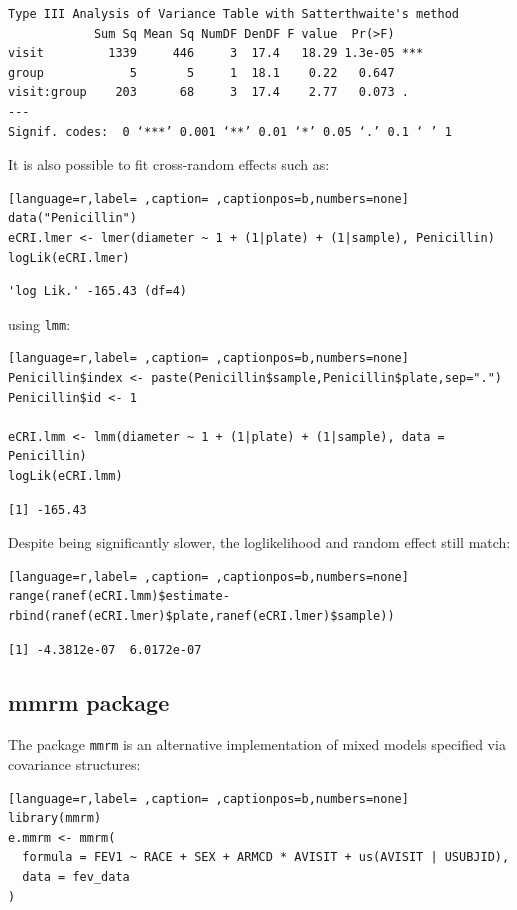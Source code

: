 \documentclass[12pt]{article}
\begin{document}
\begin{verbatim}
Type III Analysis of Variance Table with Satterthwaite's method
            Sum Sq Mean Sq NumDF DenDF F value  Pr(>F)    
visit         1339     446     3  17.4   18.29 1.3e-05 ***
group            5       5     1  18.1    0.22   0.647    
visit:group    203      68     3  17.4    2.77   0.073 .  
---
Signif. codes:  0 ‘***’ 0.001 ‘**’ 0.01 ‘*’ 0.05 ‘.’ 0.1 ‘ ’ 1
\end{verbatim}


It is also possible to fit cross-random effects such as:
\begin{lstlisting}[language=r,label= ,caption= ,captionpos=b,numbers=none]
data("Penicillin")
eCRI.lmer <- lmer(diameter ~ 1 + (1|plate) + (1|sample), Penicillin)
logLik(eCRI.lmer)
\end{lstlisting}

\begin{verbatim}
'log Lik.' -165.43 (df=4)
\end{verbatim}



using \texttt{lmm}:
\begin{lstlisting}[language=r,label= ,caption= ,captionpos=b,numbers=none]
Penicillin$index <- paste(Penicillin$sample,Penicillin$plate,sep=".")
Penicillin$id <- 1

eCRI.lmm <- lmm(diameter ~ 1 + (1|plate) + (1|sample), data = Penicillin)
logLik(eCRI.lmm)
\end{lstlisting}

\begin{verbatim}
[1] -165.43
\end{verbatim}


Despite being significantly slower, the loglikelihood and random
effect still match:
\begin{lstlisting}[language=r,label= ,caption= ,captionpos=b,numbers=none]
range(ranef(eCRI.lmm)$estimate-rbind(ranef(eCRI.lmer)$plate,ranef(eCRI.lmer)$sample))
\end{lstlisting}

\begin{verbatim}
[1] -4.3812e-07  6.0172e-07
\end{verbatim}

\subsection{mmrm package}
\label{sec:org5a7374d}

The package \texttt{mmrm} is an alternative implementation of mixed models
specified via covariance structures:
\begin{lstlisting}[language=r,label= ,caption= ,captionpos=b,numbers=none]
library(mmrm)
e.mmrm <- mmrm(
  formula = FEV1 ~ RACE + SEX + ARMCD * AVISIT + us(AVISIT | USUBJID),
  data = fev_data
)
\end{lstlisting}
\end{document}
